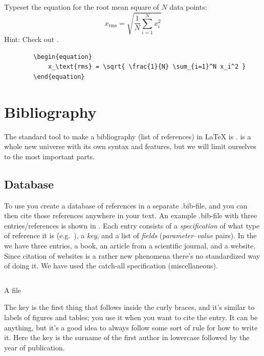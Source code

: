 {\begin{ExerciseList}
	\Exercise Typeset the equation for the root mean square of $N$ data points:
		\begin{equation}
			x_\text{rms} = \sqrt{ \frac{1}{N} \sum_{i=1}^N x_i^2 }
		\end{equation}
		Hint: Check out \latexin{\sum}.
	\Answer ~\\
	\begin{verbatim}
		\begin{equation}
			x_\text{rms} = \sqrt{ \frac{1}{N} \sum_{i=1}^N x_i^2 }
		\end{equation}
	\end{verbatim}
	
\end{ExerciseList}

\section{Bibliography}
\index{\bibtex}
The standard tool to make a bibliography (list of references) in \LaTeX{} is \bibtex{}. \bibtex{} is a whole new universe with its own syntax and features, but we will limit ourselves to the most important parts.

\subsection{Database}
To use \bibtex{} you create a database of references in a separate .bib-file, and you can then cite those references anywhere in your text. An example .bib-file with three entries/references is shown in . Each entry consists of a \emph{specification} of what type of reference it is (e.g.\ ), a \emph{key}, and a list of \emph{fields} (\emph{parameter}--\emph{value} pairs). In  the we have three entries, a book, an article from a scientific journal, and a website. Since citation of websites is a rather new phenomena there's no standardized way of doing it. We have used the catch-all specification  (miscellaneous).

\begin{listing}
	\inputminted[frame=lines,linenos]{latex}{latex/main.bib}
	\caption{A \bibtex{} file}
	\label{lst:latex:bibtex}
\end{listing}

The key is the first thing that follows inside the curly braces, and it's similar to labels of figures and tables; you use it when you want to cite the entry. It can be anything, but it's a good idea to always follow some sort of rule for how to write it. Here the key is the surname of the first author in lowercase followed by the year of publication.

}
